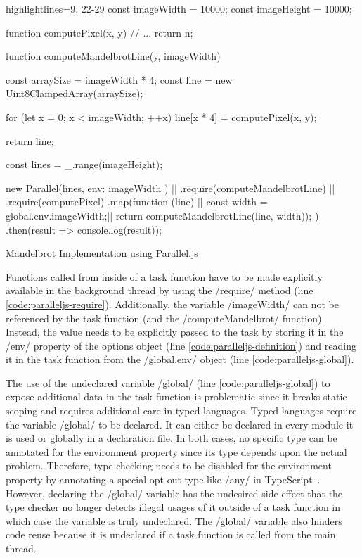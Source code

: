 \begin{listing}
	\begin{javascriptcode*}{highlightlines={9, 22-29}}
const imageWidth = 10000;
const imageHeight = 10000;

function computePixel(x, y) {
	// ...
	return n;
}

function computeMandelbrotLine(y, imageWidth) {
	const arraySize = imageWidth * 4;
	const line = new Uint8ClampedArray(arraySize);
	
	for (let x = 0; x < imageWidth; ++x) {
		line[x * 4] = computePixel(x, y);
	}
	
	return line;
}

const lines = _.range(imageHeight);

new Parallel(lines, { env: { imageWidth } }) |$\label{code:paralleljs-definition}$|
	.require(computeMandelbrotLine) |$\label{code:paralleljs-require}$|
	.require(computePixel)
	.map(function (line) { |$\label{code:paralleljs-map}$|
		const width = global.env.imageWidth;|$\label{code:paralleljs-global}$|
		return computeMandelbrotLine(line, width));
	})
	.then(result => console.log(result));
\end{javascriptcode*}

\caption{Mandelbrot Implementation using Parallel.js}
\label{fig:mandelbrot-paralleljs}
\end{listing}

Functions called from inside of a task function have to be made explicitly available in the background thread by using the \javascriptinline/require/ method (line \ref{code:paralleljs-require}). Additionally, the variable \javascriptinline/imageWidth/ can not be referenced by the task function (and the \javascriptinline/computeMandelbrot/ function). Instead, the value needs to be explicitly passed to the task by storing it in the \javascriptinline/env/ property of the options object (line \ref{code:paralleljs-definition}) and reading it in the task function from the \javascriptinline/global.env/ object (line \ref{code:paralleljs-global}).


The use of the undeclared variable \javascriptinline/global/ (line \ref{code:paralleljs-global}) to expose additional data in the task function is problematic since it breaks static scoping and requires additional care in typed languages. Typed languages require the variable \javascriptinline/global/ to be declared. It can either be declared in every module it is used or globally in a declaration file. In both cases, no specific type can be annotated for the environment property since its type depends upon the actual problem. Therefore, type checking needs to be disabled for the environment property by annotating a special opt-out type like \javascriptinline/any/ in TypeScript~\cite{typescript}. However, declaring the \javascriptinline/global/ variable has the undesired side effect that the type checker no longer detects illegal usages of it outside of a task function in which case the variable is truly undeclared. The \javascriptinline/global/ variable also hinders code reuse because it is undeclared if a task function is called from the main thread.

